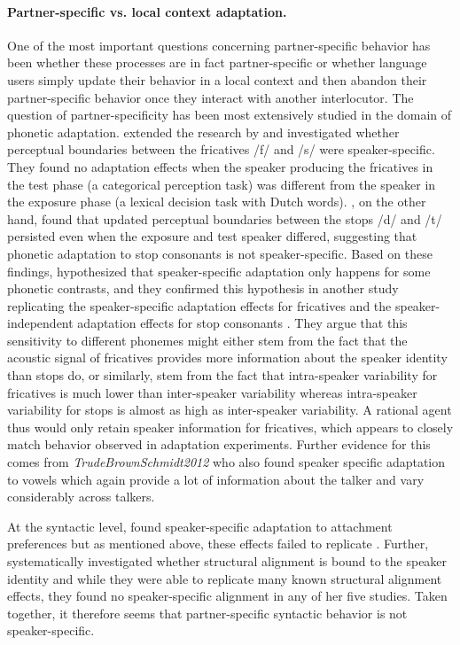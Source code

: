 \paragraph{Partner-specific vs. local context adaptation.} One of the most important questions concerning partner-specific behavior has been whether these processes are in fact
partner-specific or whether language users simply update their behavior in a local context and then abandon their partner-specific behavior once they interact with another interlocutor.
The question of partner-specificity has been most extensively studied in the domain of phonetic adaptation. \cite{EisnerMcQueen2005} extended the research by \cite{Norris2003} and
investigated whether perceptual boundaries between the fricatives /f/ and /s/ were speaker-specific. They found no adaptation effects when the speaker producing the fricatives in the 
test phase (a categorical perception task) was different from the speaker in the exposure phase (a lexical decision task with Dutch words). \cite{KraljicSamuel2006}, 
on the other hand, found that updated perceptual boundaries between the stops /d/ and /t/ persisted even when the exposure and test speaker differed, suggesting that phonetic adaptation to stop consonants
is not speaker-specific.  Based on these findings, \cite{KraljicSamuel2006} hypothesized that speaker-specific adaptation only happens for some phonetic contrasts, and they confirmed this hypothesis
in another study replicating the speaker-specific adaptation effects for fricatives and the speaker-independent adaptation effects for stop consonants \cite{KraljicSamuel2007}. They argue that 
this sensitivity to different phonemes might either stem from the fact that the acoustic signal of fricatives provides more information about the speaker identity than stops do, or similarly,
stem from the fact that intra-speaker variability for fricatives is much lower than inter-speaker variability whereas intra-speaker variability for stops is almost as high as inter-speaker variability.
A rational agent thus would only retain speaker information for fricatives, which appears to closely match behavior observed in adaptation experiments. Further evidence for this comes from \textit{TrudeBrownSchmidt2012}
who also found speaker specific adaptation to vowels which again provide a lot of information about the talker and vary considerably across talkers.

At the syntactic level, \cite{Kamide2012} found speaker-specific adaptation to attachment preferences but as mentioned above, these effects failed to replicate \cite{Liu2017}. Further, 
\cite{OstrandFerreira2019} systematically investigated whether structural alignment is bound to the speaker identity and while they were able to replicate many known structural 
alignment effects, they found no speaker-specific alignment in any of her five studies. Taken together, it therefore seems that partner-specific syntactic behavior is not speaker-specific.

